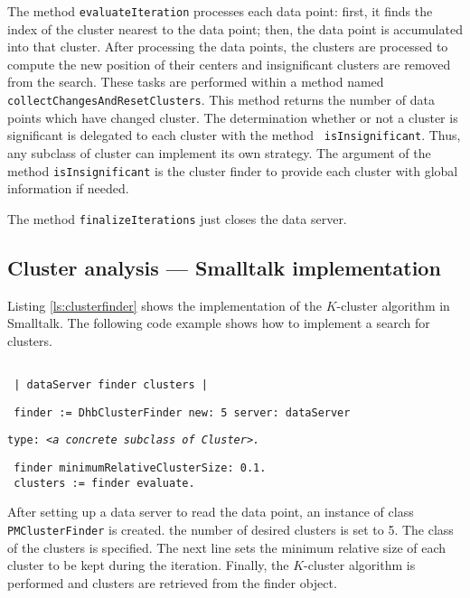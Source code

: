 {\noindent The method \texttt{evaluateIteration} processes each data
point: first, it finds the index of the cluster nearest to the
data point; then, the data point is accumulated into that cluster.
After processing the data points, the clusters are processed to
compute the new position of their centers and insignificant
clusters are removed from the search. These tasks are performed
within a method named \texttt{collectChangesAndResetClusters}. This
method returns the number of data points which have changed
cluster. The determination whether or not a cluster is significant
is delegated to each cluster with the method \texttt{
isInsignificant}. Thus, any subclass of cluster can implement its
own strategy. The argument of the method \texttt{isInsignificant} is
the cluster finder to provide each cluster with global information
if needed.

\noindent The method \texttt{finalizeIterations} just closes the data
server.

\subsection{Cluster analysis --- Smalltalk implementation}
Listing \ref{ls:clusterfinder} shows the implementation of the
$K$-cluster algorithm in Smalltalk. The following code example
shows how to implement a search for clusters.
\begin{codeExample}
\begin{verbatim}

 | dataServer finder clusters |
\end{verbatim}
\begin{verbatim}
 finder := DhbClusterFinder new: 5 server: dataServer
\end{verbatim}
\hfil{\tt type: <\sl a concrete subclass of \tt Cluster>.}
\begin{verbatim}
 finder minimumRelativeClusterSize: 0.1.
 clusters := finder evaluate.
\end{verbatim}
\end{codeExample}
After setting up a data server to read the data point, an instance
of class \texttt{PMClusterFinder} is created. the number of desired
clusters is set to 5. The class of the clusters is specified. The
next line sets the minimum relative size of each cluster to be
kept during the iteration. Finally, the $K$-cluster algorithm is
performed and clusters are retrieved from the finder object.

}
